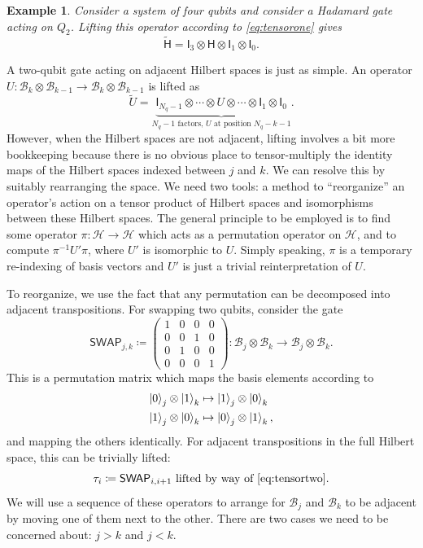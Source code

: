 \documentclass[conference]{IEEEtran}
\newcommand{\SWAP}{\ensuremath{\mathsf{SWAP}}}
\newcommand{\Hil}{\ensuremath{\mathscr{H}}}
\newcommand{\BHil}{\ensuremath{\mathscr{B}}}
\newcommand{\Id}{\mathsf{I}}
\newtheorem{example}{Example}
\begin{document}
\begin{example}
Consider a system of four qubits and consider a Hadamard gate acting on $Q_2$. Lifting this operator according to \eqref{eq:tensorone} gives
\begin{equation*}
\tilde{\mathsf{H}} = \Id_3 \otimes \mathsf{H} \otimes \Id_1 \otimes \Id_0.
\end{equation*}
\end{example}

A two-qubit gate acting on adjacent Hilbert spaces is just as simple. An operator $U:\BHil_{k}\otimes \BHil_{k-1}\to \BHil_k\otimes \BHil_{k-1}$ is lifted as
\begin{equation}\label{eq:tensortwo}
\tilde U = \underbrace{\Id_{N_q-1} \otimes \cdots \otimes U \otimes \cdots \otimes \Id_1\otimes \Id_0}_{\text{$N_q-1$ factors, $U$ at position $N_q-k-1$}}.
\end{equation}
However, when the Hilbert spaces are not adjacent, lifting involves a bit more bookkeeping because there is no obvious place to tensor-multiply the identity maps of the Hilbert spaces indexed between $j$ and $k$. We can resolve this by suitably rearranging the space. We need two tools: a method to ``reorganize'' an operator's action on a tensor product of Hilbert spaces and isomorphisms between these Hilbert spaces. The general principle to be employed is to find some operator $\pi : \Hil \to \Hil$ which acts as a permutation operator on $\Hil$, and to compute $\pi^{-1} U' \pi$, where $U'$ is isomorphic to $U$. Simply speaking, $\pi$ is a temporary re-indexing of basis vectors and $U'$ is just a trivial reinterpretation of $U$. 

To reorganize, we use the fact that any permutation can be decomposed into adjacent transpositions. For swapping two qubits, consider the gate
\begin{equation}
\SWAP_{j,k} \coloneqq
\begin{pmatrix}
1 & 0 & 0 & 0\\
0 & 0 & 1 & 0\\
0 & 1 & 0 & 0\\
0 & 0 & 0 & 1
\end{pmatrix}
: \BHil_j\otimes \BHil_k \to \BHil_j\otimes \BHil_k.
\end{equation}
This is a permutation matrix which maps the basis elements according to
\begin{align*}
\ket{0}_j\otimes\ket{1}_k &\mapsto \ket{1}_j\otimes\ket{0}_k\\
\ket{1}_j\otimes\ket{0}_k &\mapsto \ket{0}_j\otimes\ket{1}_k,
\end{align*}
and mapping the others identically. For adjacent transpositions in the full Hilbert space, this can be trivially lifted:
\begin{equation}
\tau_i \coloneqq \text{$\SWAP_{i,i+1}$ lifted by way of \eqref{eq:tensortwo}.}
\end{equation}
We will use a sequence of these operators to arrange for $\BHil_j$ and $\BHil_k$ to be adjacent by moving one of them next to the other. There are two cases we need to be concerned about: $j > k$ and $j < k$.
\end{document}
